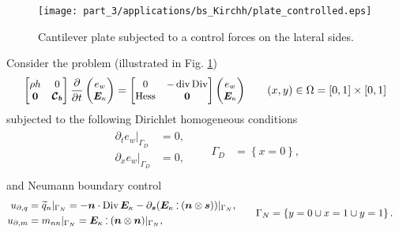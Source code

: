 \begin{figure}[t]
	\centering
	\texttt{[image: part\_3/applications/bs\_Kirchh/plate\_controlled.eps]}
	\caption{Cantilever plate subjected to a control forces on the lateral sides.}
	\label{fig:plate_controlled}
\end{figure}

Consider the problem (illustrated in Fig. \ref{fig:plate_controlled})
\begin{equation*}\small
\begin{bmatrix}
\rho h & 0 \\ 
\bm{0} & \bm{\mathcal{C}_b} \\
\end{bmatrix}
\diffp{}{t}
\begin{pmatrix}
e_w \\ \bm{E}_\kappa \\
\end{pmatrix} = 
\begin{bmatrix}
0 & -\div\Div \\ 
\Hess & \bm{0} \\
\end{bmatrix}
\begin{pmatrix}
e_w \\ \bm{E}_\kappa \\
\end{pmatrix} \qquad (x, y) \in \Omega = [0, 1]\times[0,1]
\end{equation*}
subjected to the following Dirichlet homogeneous conditions
\begin{align*}
\begin{aligned}
\partial_t e_w|_{\Gamma_D} &= 0, \\
\partial_x e_w|_{\Gamma_D} &= 0, \\
\end{aligned} \qquad {\Gamma_D} &= \left\{x = 0 \right\},
\end{align*}
and Neumann boundary control
\begin{align*}
\begin{aligned}
u_{\partial, q} & = \widetilde{q}_n|_{\Gamma_N} = -\bm{n} \cdot \Div \bm{E}_\kappa - \partial_{\bm{s}} (\bm{E}_\kappa \cddot (\bm{n} \otimes \bm{s}))|_{\Gamma_N},\\
u_{\partial, m} &= m_{nn}|_{\Gamma_N} =\bm{E}_\kappa \cddot (\bm{n}\otimes \bm{n})|_{\Gamma_N}, \; \\
\end{aligned} \qquad {\Gamma_N} &= \left\{y = 0 \cup x=1 \cup y=1 \right\}.
\end{align*}
